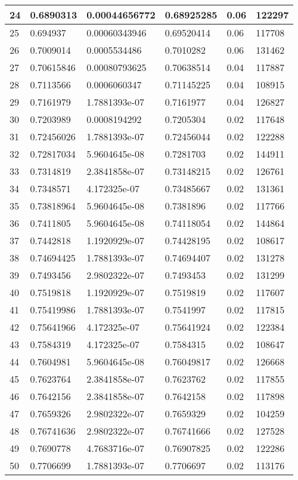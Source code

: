 \begin{longtable}{|l|l|l|l|l|l|}
24 & 0.6890313 & 0.00044656772 & 0.68925285 & 0.06 & 122297 \\ \hline 
25 & 0.694937 & 0.00060343946 & 0.69520414 & 0.06 & 117708 \\ \hline 
26 & 0.7009014 & 0.0005534486 & 0.7010282 & 0.06 & 131462 \\ \hline 
27 & 0.70615846 & 0.00080793625 & 0.70638514 & 0.04 & 117887 \\ \hline 
28 & 0.7113566 & 0.0006060347 & 0.71145225 & 0.04 & 108915 \\ \hline 
29 & 0.7161979 & 1.7881393e-07 & 0.7161977 & 0.04 & 126827 \\ \hline 
30 & 0.7203989 & 0.0008194292 & 0.7205304 & 0.02 & 117648 \\ \hline 
31 & 0.72456026 & 1.7881393e-07 & 0.72456044 & 0.02 & 122288 \\ \hline 
32 & 0.72817034 & 5.9604645e-08 & 0.7281703 & 0.02 & 144911 \\ \hline 
33 & 0.7314819 & 2.3841858e-07 & 0.73148215 & 0.02 & 126761 \\ \hline 
34 & 0.7348571 & 4.172325e-07 & 0.73485667 & 0.02 & 131361 \\ \hline 
35 & 0.73818964 & 5.9604645e-08 & 0.7381896 & 0.02 & 117766 \\ \hline 
36 & 0.7411805 & 5.9604645e-08 & 0.74118054 & 0.02 & 144864 \\ \hline 
37 & 0.7442818 & 1.1920929e-07 & 0.74428195 & 0.02 & 108617 \\ \hline 
38 & 0.74694425 & 1.7881393e-07 & 0.74694407 & 0.02 & 131278 \\ \hline 
39 & 0.7493456 & 2.9802322e-07 & 0.7493453 & 0.02 & 131299 \\ \hline 
40 & 0.7519818 & 1.1920929e-07 & 0.7519819 & 0.02 & 117607 \\ \hline 
41 & 0.75419986 & 1.7881393e-07 & 0.7541997 & 0.02 & 117815 \\ \hline 
42 & 0.75641966 & 4.172325e-07 & 0.75641924 & 0.02 & 122384 \\ \hline 
43 & 0.7584319 & 4.172325e-07 & 0.7584315 & 0.02 & 108647 \\ \hline 
44 & 0.7604981 & 5.9604645e-08 & 0.76049817 & 0.02 & 126668 \\ \hline 
45 & 0.7623764 & 2.3841858e-07 & 0.7623762 & 0.02 & 117855 \\ \hline 
46 & 0.7642156 & 2.3841858e-07 & 0.7642158 & 0.02 & 117898 \\ \hline 
47 & 0.7659326 & 2.9802322e-07 & 0.7659329 & 0.02 & 104259 \\ \hline 
48 & 0.76741636 & 2.9802322e-07 & 0.76741666 & 0.02 & 127528 \\ \hline 
49 & 0.7690778 & 4.7683716e-07 & 0.76907825 & 0.02 & 122286 \\ \hline 
50 & 0.7706699 & 1.7881393e-07 & 0.7706697 & 0.02 & 113176 \\ \hline 
\end{longtable}